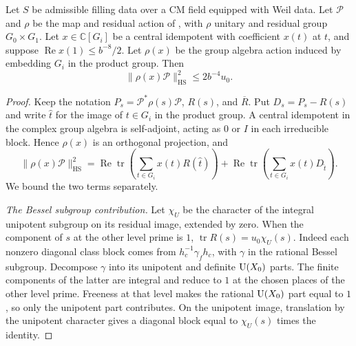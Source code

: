 \begin{lemma}
\label{lem:b-one-level-moment}
\emitthmsource
Let $S$ be admissible filling data over a CM field equipped with Weil data.
Let $\mathcal P$ and $\rho$ be the map and residual action of ,
with $\rho$ unitary and residual group $G_0\times G_1$.
Let $x\in\mathbb C[G_i]$ be a central idempotent with coefficient $x(t)$ at $t$,
and suppose $\operatorname{Re} x(1)\le b^{-8}/2$.
Let $\rho(x)$ be the group algebra action induced by embedding $G_i$ in the product group. Then
\[
 \|\rho(x)\mathcal P\|_{\mathrm{HS}}^2\le 2b^{-4}u_0.
\]
\end{lemma}
\begin{proof}
Keep the notation $P_s=\mathcal P^*\rho(s)\mathcal P$, $R(s)$, and $\overline R$.
Put $D_s=P_s-R(s)$ and write $\widehat t$ for the image of $t\in G_i$ in the product group.
A central idempotent in the complex group algebra is self-adjoint, acting as $0$ or $I$ in each irreducible block.
Hence $\rho(x)$ is an orthogonal projection, and
\[
 \|\rho(x)\mathcal P\|_{\mathrm{HS}}^2
 =\operatorname{Re}\operatorname{tr}
       \left(\sum_{t\in G_i}x(t)R(\widehat t)\right)
  +\operatorname{Re}\operatorname{tr}
       \left(\sum_{t\in G_i}x(t)D_{\widehat t}\right).
\]
We bound the two terms separately.

\emph{The Bessel subgroup contribution.}
Let $\chi_U$ be the character of the integral unipotent subgroup on its residual image, extended by zero.
When the component of $s$ at the other level prime is $1$,
$\operatorname{tr}R(s)=u_0\chi_U(s)$.
Indeed each nonzero diagonal class block comes from $h_c^{-1}\gamma_f h_c$, with $\gamma$ in the rational Bessel subgroup.
Decompose $\gamma$ into its unipotent and definite
$\operatorname{U}(X_0)$ parts. The finite components of the latter are integral and reduce to $1$ at the chosen places of the other level prime.
Freeness at that level makes the rational $\operatorname{U}(X_0)$ part equal to $1$, so only the unipotent part contributes.
On the unipotent image, translation by the unipotent character gives a diagonal block equal to $\chi_U(s)$ times the identity.


\end{proof}
